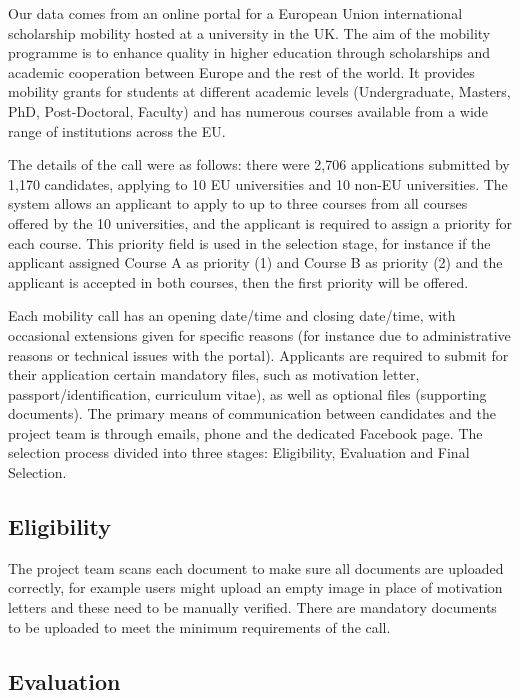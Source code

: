 \documentclass[letterpaper]{article}
\begin{document}
Our data comes from an online portal for a European Union
international scholarship mobility hosted at a university in the
UK. The aim of the mobility programme is to enhance quality in higher
education through scholarships and academic cooperation between Europe
and the rest of the world. It provides mobility grants for students at
different academic levels (Undergraduate, Masters, PhD, Post-Doctoral,
Faculty) and has numerous courses available from a wide range of
institutions across the EU.

The details of the call were as follows: there were 2,706 applications
submitted by 1,170 candidates, applying to 10 EU universities and 10
non-EU universities. The system allows an applicant to apply to up to
three courses from all courses offered by the 10 universities, and the
applicant is required to assign a priority for each course. This
priority field is used in the selection stage, for instance if the
applicant assigned Course A as priority (1) and Course B as priority
(2) and the applicant is accepted in both courses, then the first
priority will be offered.

Each mobility call has an opening date/time and closing date/time,
with occasional extensions given for specific reasons (for instance
due to administrative reasons or technical issues with the
portal). Applicants are required to submit for their application
certain mandatory files, such as motivation letter,
passport/identification, curriculum vitae), as well as optional files
(supporting documents). The primary means of communication between
candidates and the project team is through emails, phone and the
dedicated Facebook page. The selection process divided into three
stages: Eligibility, Evaluation and Final Selection.

\subsection{Eligibility}

The project team scans each document to make sure all documents are
uploaded correctly, for example users might upload an empty image in
place of motivation letters and these need to be manually
verified. There are mandatory documents to be uploaded to meet the
minimum requirements of the call.

\subsection{Evaluation}
\end{document}
